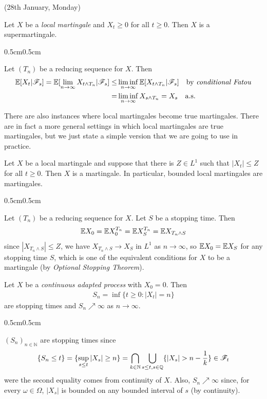 \documentclass[12pt,a4paper]{article}
\newenvironment{proof}
{\begin{changemargin}{0.5cm}{0.5cm} 
	}%
	{\end{changemargin}
}
\newenvironment{p}
{\begin{proof} 
	}%
	{\end{proof}
}
\begin{document}
\newday

(28th January, Monday)
\s

\prop Let $X$ be a \emph{local martingale} and $X_t \geq 0$ for all $t\geq 0$. Then $X$ is a supermartingale.
\begin{proof}
\pf Let $(T_n)$ be a reducing sequence for $X$. Then
\begin{align*}
\mathbb{E} [X_t | \mathscr{F}_s] = \mathbb{E}[\lim_{n\rightarrow \infty} X_{t\wedge T_n} | \mathscr{F}_s] \leq &\liminf_{n\rightarrow \infty} \mathbb{E}[X_{t\wedge T_n} | \mathscr{F}_s] \quad \text{by \emph{conditional Fatou}}\\
=&\liminf_{n\rightarrow \infty} X_{s\wedge T_n}= X_s \quad \text{a.s.}
\end{align*}

\eop
\end{proof}
\s

There are also instances where local martingales become true martingales. There are in fact a more general settings in which local martingales are true martingales, but we just state a simple version that we are going to use in practice.
\s

\prop Let $X$ be a local martingale and suppose that there is $Z\in L^1$ such that $|X_t| \leq Z$ for all $t\geq 0$. Then $X$ is a martingale. In particular, bounded local martingales are martingales.
\begin{p}
\pf Let $(T_n)$ be a reducing sequence for $X$. Let $S$ be a stopping time. Then
\begin{align*}
\mathbb{E} X_0 = \mathbb{E} X_0^{T_n} = \mathbb{E} X_S^{T_n} = \mathbb{E} X_{T_n \wedge S}
\end{align*}
since $|X_{T_n \wedge S}|\leq Z$, we have $X_{T_n \wedge S} \rightarrow X_S$ in $L^1$ as $n\rightarrow \infty$, so $\mathbb{E} X_0 = \mathbb{E} X_S$ for any stopping time $S$, which is one of the equivalent conditions for $X$ to be a martingale (by \emph{Optional Stopping Theorem}).

\eop
\end{p}
\s

\fact Let $X$ be a \emph{continuous adapted process} with $X_0 =0$. Then
\begin{align*}
S_n = \inf\{t\geq 0 : |X_t| =n\}
\end{align*}
are stopping times and $S_n \nearrow \infty$ as $n\rightarrow \infty.$
\begin{p}
\pf $(S_n)_{n\in \mathbb{N}}$ are stopping times since
\begin{align*}
\{S_n \leq t\} =\{\sup_{s\leq t} |X_s| \geq n \} = \bigcap_{k\in \mathbb{N}}\bigcup_{s\leq t, s\in \mathbb{Q}} \{|X_s| > n- \frac{1}{k}\} \in \mathscr{F}_t
\end{align*}
were the second equality comes from continuity of $X$. Also, $S_n \nearrow \infty$ since, for every $\omega \in \Omega$, $|X_s|$ is bounded on any bounded interval of $s$ (by continuity).

\eop
\end{p}
\s
\end{document}
